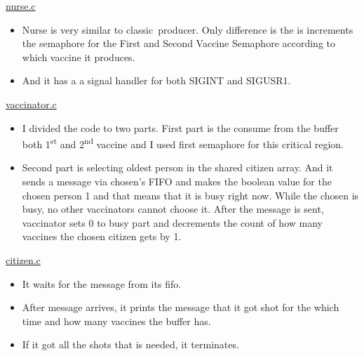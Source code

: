 \documentclass[12pt]{report}
\renewcommand{\_}{\kern-1.5pt\textunderscore\kern-1.5pt}
\begin{document}
\vspace{\baselineskip}
\newpage
\begin{justify}
{\fontsize{16pt}{19.2pt}\selectfont \uline{nurse.c}}
\end{justify}
\begin{itemize}
	\item Nurse is very similar to classic\ producer.  Only difference is the is increments the semaphore for the First and Second Vaccine Semaphore according to which vaccine it produces. 
	\item And it has a a signal handler for both SIGINT and SIGUSR1.
\end{itemize}
\begin{justify}
{\fontsize{16pt}{19.2pt}\selectfont \uline{vaccinator.c}}
\end{justify}
\begin{itemize}
	\item I divided the code to two parts. First part is the consume from the buffer both 1\textsuperscript{st} and 2\textsuperscript{nd} vaccine and I used first semaphore for this critical region. 
	\item Second part is selecting oldest person in the shared citizen array. And it sends a message via chosen’s FIFO and makes the boolean value for the chosen person 1 and that means that it is busy right now. While the chosen is busy, no other vaccinators cannot choose it. After the message is sent, vaccinator sets 0 to busy part and decrements the count of how many vaccines the chosen citizen gets by 1.
\end{itemize}
\begin{justify}
{\fontsize{16pt}{19.2pt}\selectfont \uline{citizen.c}}
\end{justify}
\begin{itemize}
	\item It waits for the message from its fifo. 
	\item After message arrives, it prints the message that it got shot for the which time and how many vaccines the buffer has.
	\item If it got all the shots that is needed, it terminates.
\end{itemize}

\vspace{\baselineskip}

\vspace{\baselineskip}

\vspace{\baselineskip}
\end{document}
